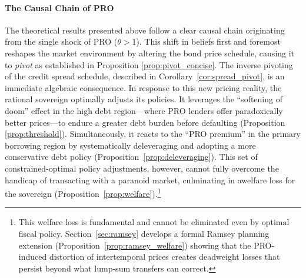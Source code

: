 \documentclass[12pt]{article}
\theoremstyle{plain}
\begin{document}
\paragraph{The Causal Chain of PRO}
The theoretical results presented above follow a clear causal chain originating
from the single shock of PRO ($\theta > 1$). This shift in beliefs first and
foremost reshapes the market environment by altering the bond price schedule,
causing it to \textit{pivot} as established in Proposition
\ref{prop:pivot_concise}. The inverse pivoting of the credit spread schedule,
described in Corollary~\ref{cor:spread_pivot}, is an immediate algebraic
consequence. In response to this new pricing reality, the rational sovereign
optimally adjusts its policies. It leverages the ``softening of doom'' effect
in the high debt region—where PRO lenders offer paradoxically better prices—to
endure a greater debt burden before defaulting (Proposition
\ref{prop:threshold}). Simultaneously, it reacts to the ``PRO premium'' in the
primary borrowing region by systematically deleveraging and adopting a more
conservative debt policy (Proposition~\ref{prop:deleveraging}). This set of
constrained-optimal policy adjustments, however, cannot fully overcome the
handicap of transacting with a paranoid market, culminating in awelfare loss
for the sovereign (Proposition~\ref{prop:welfare}).\footnote{This welfare loss
	is fundamental and cannot be eliminated even by optimal fiscal policy.
	Section~\ref{sec:ramsey} develops a formal Ramsey planning extension
	(Proposition~\ref{prop:ramsey_welfare}) showing that the PRO-induced distortion
	of intertemporal prices creates deadweight losses that persist beyond what
	lump-sum transfers can correct.}
\end{document}
